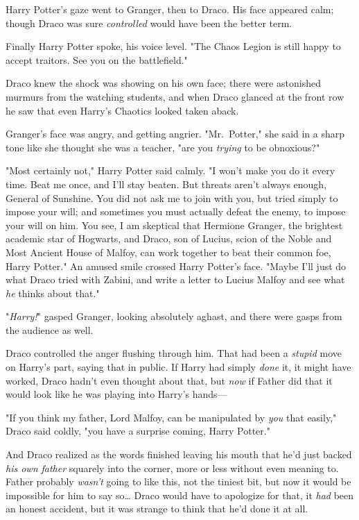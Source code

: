 Harry Potter's gaze went to Granger, then to Draco. His face appeared calm;
though Draco was sure \emph{controlled} would have been the better term.

Finally Harry Potter spoke, his voice level. "The Chaos Legion is still happy
to accept traitors. See you on the battlefield."

Draco knew the shock was showing on his own face; there were astonished murmurs
from the watching students, and when Draco glanced at the front row he saw that
even Harry's Chaotics looked taken aback.

Granger's face was angry, and getting angrier. "Mr.~Potter," she said in a
sharp tone like she thought she was a teacher, "are you \emph{trying} to be
obnoxious?"

"Most certainly not," Harry Potter said calmly. "I won't make you do it every
time. Beat me once, and I'll stay beaten. But threats aren't always enough,
General of Sunshine. You did not ask me to join with you, but tried simply to
impose your will; and sometimes you must actually defeat the enemy, to impose
your will on him. You see, I am skeptical that Hermione Granger, the brightest
academic star of Hogwarts, and Draco, son of Lucius, scion of the Noble and
Most Ancient House of Malfoy, can work together to beat their common foe, Harry
Potter." An amused smile crossed Harry Potter's face. "Maybe I'll just do what
Draco tried with Zabini, and write a letter to Lucius Malfoy and see what
\emph{he} thinks about that."

"\emph{Harry!}" gasped Granger, looking absolutely aghast, and there were gasps
from the audience as well.

Draco controlled the anger flushing through him. That had been a \emph{stupid}
move on Harry's part, saying that in public. If Harry had simply \emph{done}
it, it might have worked, Draco hadn't even thought about that, but \emph{now}
if Father did that it would look like he was playing into Harry's hands---

"If you think my father, Lord Malfoy, can be manipulated by \emph{you} that
easily," Draco said coldly, "you have a surprise coming, Harry Potter."

And Draco realized as the words finished leaving his mouth that he'd just
backed \emph{his own father} squarely into the corner, more or less without
even meaning to. Father probably \emph{wasn't} going to like this, not the
tiniest bit, but now it would be impossible for him to say so{\ldots} Draco
would have to apologize for that, it \emph{had} been an honest accident, but it
was strange to think that he'd done it at all.

